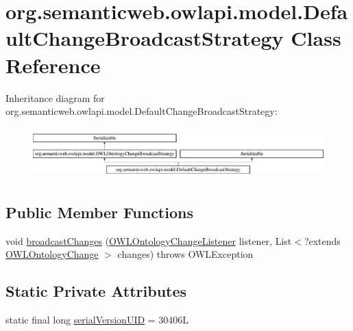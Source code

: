 \hypertarget{classorg_1_1semanticweb_1_1owlapi_1_1model_1_1_default_change_broadcast_strategy}{\section{org.\-semanticweb.\-owlapi.\-model.\-Default\-Change\-Broadcast\-Strategy Class Reference}
\label{classorg_1_1semanticweb_1_1owlapi_1_1model_1_1_default_change_broadcast_strategy}
}
Inheritance diagram for org.\-semanticweb.\-owlapi.\-model.\-Default\-Change\-Broadcast\-Strategy\-:\begin{figure}[H]
\begin{center}
\leavevmode
\includegraphics[height=1.985816cm]{classorg_1_1semanticweb_1_1owlapi_1_1model_1_1_default_change_broadcast_strategy}
\end{center}
\end{figure}
\subsection*{Public Member Functions}
\begin{DoxyCompactItemize}
\item 
void \hyperlink{classorg_1_1semanticweb_1_1owlapi_1_1model_1_1_default_change_broadcast_strategy_abb940e4cffcfc8145755878eb1b7356a}{broadcast\-Changes} (\hyperlink{interfaceorg_1_1semanticweb_1_1owlapi_1_1model_1_1_o_w_l_ontology_change_listener}{O\-W\-L\-Ontology\-Change\-Listener} listener, List$<$?extends \hyperlink{classorg_1_1semanticweb_1_1owlapi_1_1model_1_1_o_w_l_ontology_change}{O\-W\-L\-Ontology\-Change} $>$ changes)  throws O\-W\-L\-Exception 
\end{DoxyCompactItemize}
\subsection*{Static Private Attributes}
\begin{DoxyCompactItemize}
\item 
static final long \hyperlink{classorg_1_1semanticweb_1_1owlapi_1_1model_1_1_default_change_broadcast_strategy_a9c55a0018194abc694ed89403c868e4a}{serial\-Version\-U\-I\-D} = 30406\-L
\end{DoxyCompactItemize}


